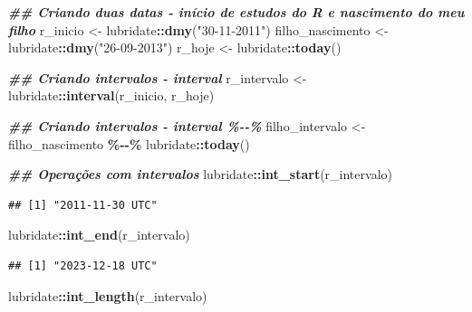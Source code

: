 \documentclass[
]{article}
\newenvironment{Shaded}{\begin{snugshade}}{\end{snugshade}}
\newcommand{\DocumentationTok}[1]{\textcolor[rgb]{0.56,0.35,0.01}{\textbf{\textit{#1}}}}
\newcommand{\FunctionTok}[1]{\textcolor[rgb]{0.13,0.29,0.53}{\textbf{#1}}}
\newcommand{\NormalTok}[1]{#1}
\newcommand{\OtherTok}[1]{\textcolor[rgb]{0.56,0.35,0.01}{#1}}
\newcommand{\SpecialCharTok}[1]{\textcolor[rgb]{0.81,0.36,0.00}{\textbf{#1}}}
\newcommand{\StringTok}[1]{\textcolor[rgb]{0.31,0.60,0.02}{#1}}
\begin{document}
\begin{Shaded}
\begin{Highlighting}[]
\DocumentationTok{\#\# Criando duas datas {-} início de estudos do R e nascimento do meu filho}
\NormalTok{r\_inicio }\OtherTok{\textless{}{-}}\NormalTok{ lubridate}\SpecialCharTok{::}\FunctionTok{dmy}\NormalTok{(}\StringTok{"30{-}11{-}2011"}\NormalTok{)}
\NormalTok{filho\_nascimento }\OtherTok{\textless{}{-}}\NormalTok{ lubridate}\SpecialCharTok{::}\FunctionTok{dmy}\NormalTok{(}\StringTok{"26{-}09{-}2013"}\NormalTok{)}
\NormalTok{r\_hoje }\OtherTok{\textless{}{-}}\NormalTok{ lubridate}\SpecialCharTok{::}\FunctionTok{today}\NormalTok{()}

\DocumentationTok{\#\# Criando intervalos {-} interval}
\NormalTok{r\_intervalo }\OtherTok{\textless{}{-}}\NormalTok{ lubridate}\SpecialCharTok{::}\FunctionTok{interval}\NormalTok{(r\_inicio, r\_hoje)}

\DocumentationTok{\#\# Criando intervalos {-} interval \%{-}{-}\%}
\NormalTok{filho\_intervalo }\OtherTok{\textless{}{-}}\NormalTok{ filho\_nascimento }\SpecialCharTok{\%{-}{-}\%}\NormalTok{ lubridate}\SpecialCharTok{::}\FunctionTok{today}\NormalTok{()}

\DocumentationTok{\#\# Operações com intervalos}
\NormalTok{lubridate}\SpecialCharTok{::}\FunctionTok{int\_start}\NormalTok{(r\_intervalo)}
\end{Highlighting}
\end{Shaded}

\begin{verbatim}
## [1] "2011-11-30 UTC"
\end{verbatim}

\begin{Shaded}
\begin{Highlighting}[]
\NormalTok{lubridate}\SpecialCharTok{::}\FunctionTok{int\_end}\NormalTok{(r\_intervalo)}
\end{Highlighting}
\end{Shaded}

\begin{verbatim}
## [1] "2023-12-18 UTC"
\end{verbatim}

\begin{Shaded}
\begin{Highlighting}[]
\NormalTok{lubridate}\SpecialCharTok{::}\FunctionTok{int\_length}\NormalTok{(r\_intervalo)}
\end{Highlighting}
\end{Shaded}
\end{document}
